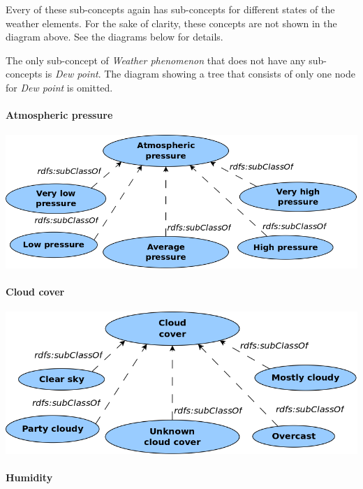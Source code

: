 Every of these sub-concepts again has sub-concepts for different states of the weather elements. For the sake of clarity, these concepts are not shown in the diagram above. See the diagrams below for details.

The only sub-concept of \emph{Weather phenomenon} that does not have any sub-concepts is \emph{Dew point}. The diagram showing a tree that consists of only one node for \emph{Dew point} is omitted.

\paragraph{Atmospheric pressure}

\begin{center}
  \includegraphics[scale=.3]{figures/diagrams/atmospheric-pressure.png}
\end{center}

\paragraph{Cloud cover}

\begin{center}
  \includegraphics[scale=.3]{figures/diagrams/cloud-cover.png}
\end{center}

\paragraph{Humidity}

